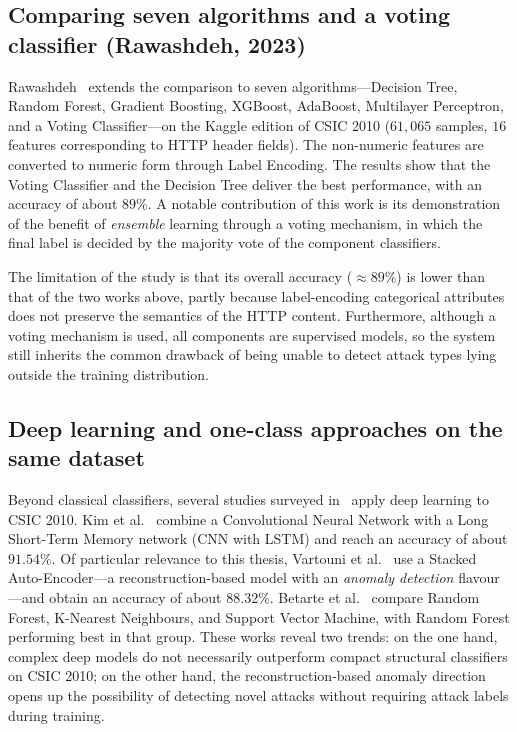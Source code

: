 \subsection{Comparing seven algorithms and a voting classifier
(Rawashdeh, 2023)}

Rawashdeh~\cite{rawashdeh2023} extends the comparison to seven
algorithms---Decision Tree, Random Forest, Gradient Boosting, XGBoost,
AdaBoost, Multilayer Perceptron, and a Voting Classifier---on the Kaggle
edition of CSIC 2010 ($61{,}065$ samples, $16$ features corresponding to
HTTP header fields). The non-numeric features are converted to numeric
form through Label Encoding. The results show that the Voting Classifier
and the Decision Tree deliver the best performance, with an accuracy of
about $89\%$. A notable contribution of this work is its demonstration of
the benefit of \emph{ensemble} learning through a voting mechanism, in
which the final label is decided by the majority vote of the component
classifiers.

The limitation of the study is that its overall accuracy ($\approx 89\%$)
is lower than that of the two works above, partly because label-encoding
categorical attributes does not preserve the semantics of the HTTP
content. Furthermore, although a voting mechanism is used, all components
are supervised models, so the system still inherits the common drawback of
being unable to detect attack types lying outside the training
distribution.

\subsection{Deep learning and one-class approaches on the same dataset}

Beyond classical classifiers, several studies surveyed
in~\cite{rawashdeh2023} apply deep learning to CSIC 2010. Kim et
al.~\cite{kim2020} combine a Convolutional Neural Network with a Long
Short-Term Memory network (CNN with LSTM) and reach an accuracy of about
$91.54\%$. Of particular relevance to this thesis, Vartouni et
al.~\cite{vartouni2018} use a Stacked Auto-Encoder---a reconstruction-based
model with an \emph{anomaly detection} flavour---and obtain an accuracy of
about $88.32\%$. Betarte et al.~\cite{betarte2018} compare Random Forest,
K-Nearest Neighbours, and Support Vector Machine, with Random Forest
performing best in that group. These works reveal two trends: on the one
hand, complex deep models do not necessarily outperform compact structural
classifiers on CSIC 2010; on the other hand, the reconstruction-based
anomaly direction opens up the possibility of detecting novel attacks
without requiring attack labels during training.


